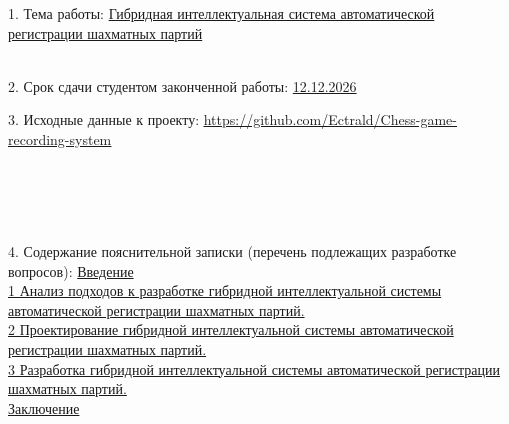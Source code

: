 {\begin{center}
  \end{center}

  1. Тема работы: \uline{Гибридная интеллектуальная система автоматической регистрации шахматных партий}\lineunderscore\\
  \lineunderscore\\
  \vspace{1em}

  2. Срок сдачи студентом законченной работы: \uline{12.12.2026}\lineunderscore

  \vspace{1em}

  3. Исходные данные к проекту: 
  \uline{\url{https://github.com/Ectrald/Chess-game-recording-system}}
  \lineunderscore\\
  \lineunderscore\\
  \lineunderscore\\
  \lineunderscore\\
  \lineunderscore\\
  \lineunderscore

  \vspace{1em}

  4. Содержание пояснительной записки (перечень подлежащих разработке вопросов):
  \uline{\hspace*{2ex}Введение}\lineunderscore\\
  \uline{\hspace*{2ex}1 Анализ подходов к разработке гибридной интеллектуальной системы автоматической регистрации шахматных партий.}\lineunderscore\\
  \uline{\hspace*{2ex}2 Проектирование гибридной интеллектуальной системы автоматической регистрации шахматных партий.}\lineunderscore\\
  \uline{\hspace*{2ex}3 Разработка гибридной интеллектуальной системы автоматической регистрации шахматных партий.}\lineunderscore\\
  \uline{\hspace*{2ex}Заключение}\lineunderscore\\
  \lineunderscore\\
  \lineunderscore\\
  \lineunderscore\\
  \lineunderscore\\
  \lineunderscore

}
